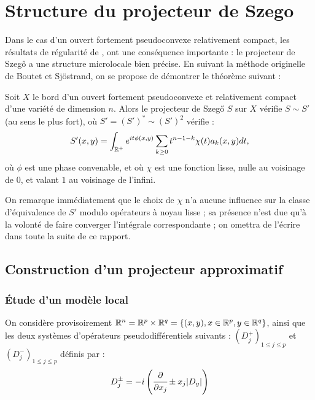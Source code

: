 \section{Structure du projecteur de Szego}

Dans le cas d'un ouvert fortement pseudoconvexe relativement compact, les résultats de régularité de \cite{kohn1963harmonic}, \cite{kohn1964harmonic} ont une conséquence importante : le projecteur de Szeg\H{o} a une structure microlocale bien précise. En suivant la méthode originelle de Boutet et Sjöstrand, on se propose de démontrer le théorème suivant :

\begin{theorem}
  Soit $X$ le bord d'un ouvert fortement pseudoconvexe et relativement
  compact d'une variété de dimension $n$. Alors le projecteur de
  Szeg\H{o} $S$ sur $X$ vérifie $S\sim S'$ (au sens le plus fort), où $S' = (S')^* \sim (S')^2$ vérifie :
  \begin{equation*}
    S'(x,y) = \int_{\mathbb{R}^+} e^{it\phi(x,y)}\sum_{k \geq 0}t^{n-1-k}\chi(t)a_k(x,y)dt,
  \end{equation*}
  \noindent où $\phi$ est une phase convenable, et où $\chi$ est une fonction lisse, nulle au voisinage de $0$, et valant $1$ au voisinage de l'infini.
\end{theorem}

On remarque immédiatement que le choix de $\chi$ n'a aucune influence sur la classe d'équivalence de $S'$ modulo opérateurs à noyau lisse ; sa présence n'est due qu'à la volonté de faire converger l'intégrale correspondante ; on omettra de l'écrire dans toute la suite de ce rapport.
\subsection{Construction d'un projecteur approximatif}

\subsubsection{Étude d'un modèle local}
On considère provisoirement $\mathbb{R}^n = \mathbb{R}^p \times \mathbb{R}^q = \{(x,y), x \in \mathbb{R}^p, y \in \mathbb{R}^q\}$, ainsi que les deux systèmes d'opérateurs pseudodifférentiels suivants : $(D^+_j)_{1 \leq j \leq p}$ et $(D^-_j)_{1 \leq j \leq p}$ définis par :
\begin{equation*}
  D^{\pm}_j = -i\left(\cfrac{\partial}{\partial x_j} \pm x_j |D_y|\right)
\end{equation*}


